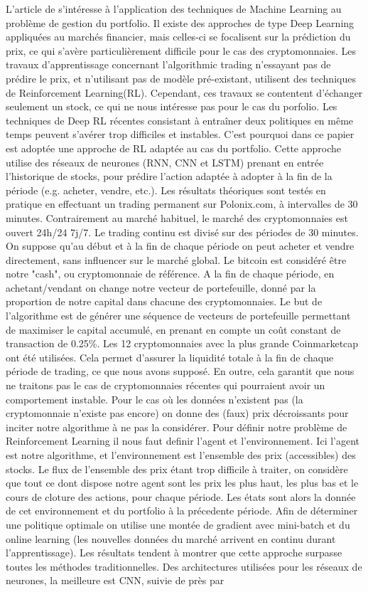 \documentclass[a4paper]{article}
\begin{document}
L'article de \textbf{\citet{Jiang2017} } s'intéresse à l'application des techniques de Machine Learning au problème de gestion du portfolio. Il existe des approches de type Deep Learning appliquées au marchés financier, mais celles-ci se focalisent sur la prédiction du prix, ce qui s'avère particulièrement difficile pour le cas des cryptomonnaies. Les travaux d'apprentissage concernant l'algorithmic trading n'essayant pas de prédire le prix, et n'utilisant pas de modèle pré-existant, utilisent des techniques de Reinforcement Learning(RL). Cependant, ces travaux se contentent d'échanger seulement un stock, ce qui ne nous intéresse pas pour le cas du porfolio. Les techniques de Deep RL récentes consistant à entraîner deux politiques en même temps peuvent s'avérer trop difficiles et instables. C'est pourquoi dans ce papier est adoptée une approche de RL adaptée au cas du portfolio. Cette approche utilise des réseaux de neurones (RNN, CNN et LSTM) prenant en entrée l'historique de stocks, pour prédire l'action adaptée à adopter à la fin de la période (e.g. acheter, vendre, etc.). Les résultats théoriques sont testés en pratique en effectuant un trading permanent sur Polonix.com, à intervalles de 30 minutes. Contrairement au marché habituel, le marché des cryptomonnaies est ouvert 24h/24 7j/7. Le trading continu est divisé sur des périodes de 30 minutes. On suppose qu'au début et à la fin de chaque période on peut acheter et vendre directement, sans influencer sur le marché global. Le bitcoin est considéré être notre "cash", ou cryptomonnaie de référence. A la fin de chaque période, en achetant/vendant on change notre vecteur de portefeuille, donné par la proportion de notre capital dans chacune des cryptomonnaies. Le but de l'algorithme est de générer une séquence de vecteurs de portefeuille permettant de maximiser le capital accumulé, en prenant en compte un coût constant de transaction de 0.25\%. Les 12 cryptomonnaies avec la plus grande Coinmarketcap ont été utilisées. Cela permet d'assurer la liquidité totale à la fin de chaque période de trading, ce que nous avons supposé. En outre, cela garantit que nous ne traitons pas le cas de cryptomonnaies récentes qui pourraient avoir un comportement instable. Pour le cas où les données n'existent pas (la cryptomonnaie n'existe pas encore) on donne des (faux) prix décroissants pour inciter notre algorithme à ne pas la considérer. Pour définir notre problème de Reinforcement Learning il nous faut definir l'agent et l'environnement. Ici l'agent est notre algorithme, et l'environnement est l'ensemble des prix (accessibles) des stocks. Le flux de l'ensemble des prix étant trop difficile à traiter, on considère que tout ce dont dispose notre agent sont les prix les plus haut, les plus bas et le cours de cloture des actions, pour chaque période. Les états sont alors la donnée de cet environnement et du portfolio à la précedente période. Afin de déterminer une politique optimale on utilise une montée de gradient avec mini-batch et du online learning (les nouvelles données du marché arrivent en continu durant l'apprentissage). Les résultats tendent à montrer que cette approche surpasse toutes les méthodes traditionnelles. Des architectures utilisées pour les réseaux de neurones, la meilleure est CNN, suivie de près par 
\end{document}
